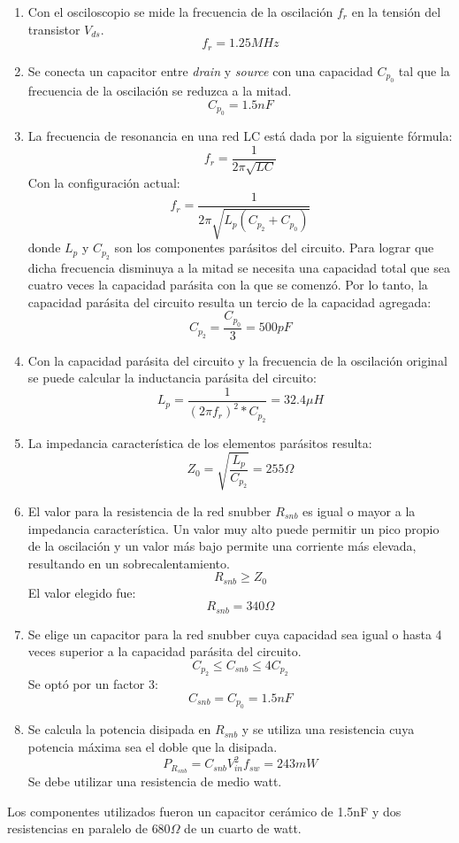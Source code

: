 \begin{enumerate}
    \item Con el osciloscopio se mide la frecuencia de la oscilación $f_{r}$ en la tensión del transistor $V_{ds}$. 
    $$ f_{r}=1.25MHz $$ 
    \item Se conecta un capacitor entre \textit{drain} y \textit{source} con una capacidad $C_{p_{0}}$ tal que la frecuencia de la oscilación se reduzca a la mitad. 
    $$ C_{p_{0}}=1.5nF $$
    \item La frecuencia de resonancia en una red LC está dada por la siguiente fórmula:
    $$ f_{r}=\frac{1}{2\pi\sqrt{LC}} $$
    Con la configuración actual: 
    $$ f_{r}=\frac{1}{2\pi\sqrt{L_{p}(C_{p_{2}}+C_{p_{0}})}} $$
    donde $L_{p}$ y $C_{p_2}$ son los componentes parásitos del circuito.
    Para lograr que dicha frecuencia disminuya a la mitad se necesita una capacidad total que sea cuatro veces la capacidad parásita con la que se comenzó.
    Por lo tanto, la capacidad parásita del circuito resulta un tercio de la capacidad agregada:
    $$ C_{p_{2}} = \frac{C_{p_{0}}}{3}=500pF $$
    \item Con la capacidad parásita del circuito y la frecuencia de la oscilación original se puede calcular la inductancia parásita del circuito:
    $$ L_{p}=\frac{1}{(2\pi f_{r})^{2}*C_{p_{2}}}=32.4\mu H $$
    \item La impedancia característica de los elementos parásitos resulta:
    $$ Z_{0}=\sqrt{\frac{L_p}{C_{p_2}}}=255\Omega $$
\item El valor para la resistencia de la red snubber $R_{snb}$ es igual o mayor a la impedancia característica. 
Un valor muy alto puede permitir un pico propio de la oscilación y un valor más bajo permite una corriente más elevada, resultando en un sobrecalentamiento.
$$ R_{snb} \ge Z_{0} $$
El valor elegido fue:
    $$ R_{snb}=340\Omega $$
    \item Se elige un capacitor para la red snubber cuya capacidad sea igual o hasta 4 veces superior a la capacidad parásita del circuito. 
    $$ C_{p_2}\leq C_{snb}\leq 4C_{p_2} $$
    Se optó por un factor 3:
    $$ C_{snb}=C_{p_{0}}=1.5nF $$
    \item Se calcula la potencia disipada en $R_{snb}$ y se utiliza una resistencia cuya potencia máxima sea el doble que la disipada.
    $$ P_{R_{snb}}=C_{snb}V_{in}^2f_{sw}= 243mW $$  
    Se debe utilizar una resistencia de medio watt.
\end{enumerate}

Los componentes utilizados fueron un capacitor cerámico de 1.5nF y dos resistencias en paralelo de $680\Omega$ de un cuarto de watt. 
